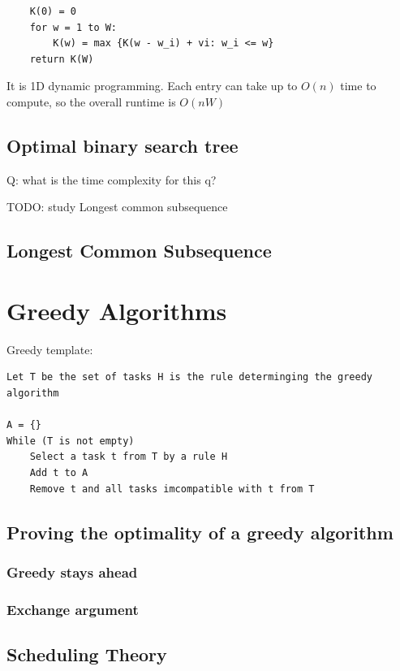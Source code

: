 \documentclass[12pt,a4paper]{article}
\begin{document}
\begin{verbatim}
    K(0) = 0
    for w = 1 to W:
        K(w) = max {K(w - w_i) + vi: w_i <= w}
    return K(W)
\end{verbatim}

It is 1D dynamic programming. Each entry can take up to $O(n)$ time to compute, so the overall runtime is $O(nW)$ 

\subsection*{Optimal binary search tree}

Q: what is the time complexity for this q?

TODO: study Longest common subsequence

\subsection*{Longest Common Subsequence}

\section*{Greedy Algorithms}

Greedy template:
\begin{verbatim}
Let T be the set of tasks H is the rule determinging the greedy algorithm

A = {}
While (T is not empty)
    Select a task t from T by a rule H
    Add t to A
    Remove t and all tasks imcompatible with t from T
\end{verbatim}

\subsection*{Proving the optimality of a greedy algorithm}

\subsubsection*{Greedy stays ahead}

\subsubsection*{Exchange argument}

\subsection*{Scheduling Theory}
\end{document}
